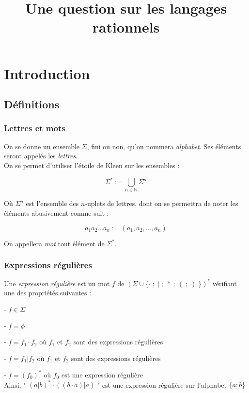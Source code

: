 \documentclass{article}
\title{Une question sur les langages rationnels}
\author{}
\date{}
\begin{document}
\maketitle
\tableofcontents


\section{Introduction}

\subsection{Définitions}

\subsubsection{Lettres et mots}

On se donne un ensemble $\Sigma$, fini ou non, qu'on nommera \textit{alphabet}. Ses éléments seront appelés les \textit{lettres}.
\\

On se permet d'utiliser l'étoile de Kleen sur les ensembles :

$$\Sigma^* := \bigcup_{n \in \mathbb{N}} \Sigma^n$$

Où $\Sigma^n$ est l'ensemble des $n$-uplets de lettres, dont on se permettra de noter les éléments abusivement comme suit :

$$ a_1a_2...a_n := (a_1,a_2,...,a_n)$$

On appellera \textit{mot} tout élément de $\Sigma^*$.

\subsubsection{Expressions régulières}

Une \textit{expression régulière} est un mot $f$ de $(\Sigma \cup \{ \cdot \; ; \; | \; ; \; * \: ; \: ( \; ; \; ) \; \})^*$ vérifiant une des propriétés suivantes :

- $f \in \Sigma$

- $f = \phi$

- $f = f_1 \cdot f_2$ où $f_1$ et $f_2$ sont des expressions régulières

- $f = f_1 | f_2$ où $f_1$ et $f_2$ sont des expressions régulières

- $f = (f_0)^*$ où $f_0$ est une expression régulière
\\

Ainsi, " $(a|b)^*\cdot ((b \cdot a) | a) $ " est une expression régulière sur l'alphabet $\{ a ; b\}$
\\
\\
\end{document}
